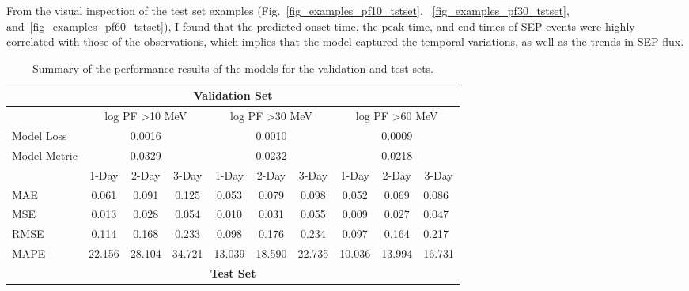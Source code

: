From the visual inspection of the test set examples (Fig.~\ref{fig_examples_pf10_tstset}, ~\ref{fig_examples_pf30_tstset}, and~\ref{fig_examples_pf60_tstset}), I found that the predicted onset time, the peak time, and end times of SEP events were highly correlated with those of the observations, which implies that the model captured the temporal variations, as well as the trends in SEP flux.

\begin{table}[htp]
\centering
\caption{Summary of the performance results of the models for the validation and test sets.}
\begin{tabular}{lccccccccl}
\hline
\multicolumn{10}{c}{\textbf{Validation Set}}                                                                                                                 \\ \hline
       & \multicolumn{3}{c}{log PF \textgreater{}10 MeV} & \multicolumn{3}{c}{log PF \textgreater{}30 MeV} & \multicolumn{3}{c}{log PF \textgreater{}60 MeV} \\ \hline
Model Loss   & \multicolumn{3}{c}{0.0016}                      & \multicolumn{3}{c}{0.0010}                      & \multicolumn{3}{c}{0.0009}                      \\
Model Metric & \multicolumn{3}{c}{0.0329}                      & \multicolumn{3}{c}{0.0232}                      & \multicolumn{3}{c}{0.0218}                      \\ \hline
       & 1-Day          & 2-Day          & 3-Day         & 1-Day          & 2-Day          & 3-Day         & 1-Day    & 2-Day   & \multicolumn{1}{c}{3-Day}  \\ \hline
MAE    & 0.061          & 0.091          & 0.125         & 0.053          & 0.079          & 0.098         & 0.052    & 0.069   & 0.086                      \\
MSE    & 0.013          & 0.028          & 0.054         & 0.010          & 0.031          & 0.055         & 0.009    & 0.027   & 0.047                      \\
RMSE   & 0.114          & 0.168          & 0.233         & 0.098          & 0.176          & 0.234         & 0.097    & 0.164   & 0.217                      \\
MAPE   & 22.156         & 28.104         & 34.721        & 13.039         & 18.590         & 22.735        & 10.036   & 13.994  & 16.731                     \\ \hline
\multicolumn{10}{c}{\textbf{Test Set}}                                                                                                                       \\ \hline

\end{tabular}
\end{table}
